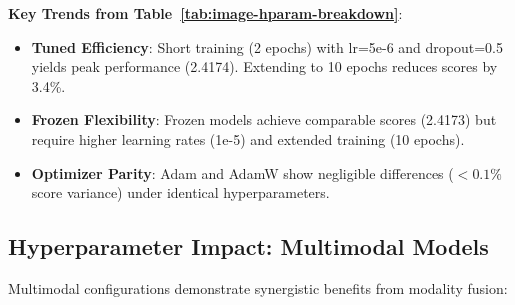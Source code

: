 \noindent \textbf{Key Trends from Table~\ref{tab:image-hparam-breakdown}}:
\begin{itemize}
    \item \textbf{Tuned Efficiency}: Short training (2 epochs) with lr=5e-6 and dropout=0.5 yields peak performance (2.4174). Extending to 10 epochs reduces scores by 3.4\%.
    \item \textbf{Frozen Flexibility}: Frozen models achieve comparable scores (2.4173) but require higher learning rates (1e-5) and extended training (10 epochs).
    \item \textbf{Optimizer Parity}: Adam and AdamW show negligible differences ($<0.1\%$ score variance) under identical hyperparameters.
\end{itemize}

\subsection{Hyperparameter Impact: Multimodal Models}
\label{subsec:multimodal-hparams}

Multimodal configurations demonstrate synergistic benefits from modality fusion:

